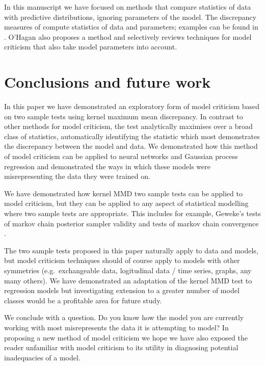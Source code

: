 \documentclass{article} %
\def\eg{e.g.\ }
\begin{document}
In this manuscript we have focused on methods that compare statistics of data with predictive distributions, ignoring parameters of the model.
The discrepancy measures of \cite{Gelman1996-ez} compute statistics of data and parameters; examples can be found in \cite{Gelman2013-st}.
O'Hagan \citep{OHagan2003-bc} also proposes a method and selectively reviews techniques for model criticism that also take model parameters into account.


\section{Conclusions and future work}

In this paper we have demonstrated an exploratory form of model criticism based on two sample tests using kernel maximum mean discrepancy.
In contrast to other methods for model criticism, the test analytically maximises over a broad class of statistics, automatically identifying the statistic which most demonstrates the discrepancy between the model and data.
We demonstrated how this method of model criticism can be applied to neural networks and Gaussian process regression and demonstrated the ways in which these models were misrepresenting the data they were trained on.

We have demonstrated how kernel MMD two sample tests can be applied to model criticism, but they can be applied to any aspect of statistical modelling where two sample tests are appropriate.
This includes for example, Geweke's tests of markov chain posterior sampler validity \citep{Geweke2004-yx} and tests of markov chain convergence \citep[e.g.][]{Cowles1996-qy}.

The two sample tests proposed in this paper naturally apply to \iid data and models, but model criticism techniques should of course apply to models with other symmetries (\eg exchangeable data, logitudinal data / time series, graphs, any many others).
We have demonstrated an adaptation of the kernel MMD test to regression models but investigating extension to a greater number of model classes would be a profitable area for future study.

We conclude with a question.
Do you know how the model you are currently working with most misrepresents the data it is attempting to model?
In proposing a new method of model criticism we hope we have also exposed the reader unfamiliar with model criticism to its utility in diagnosing potential inadequacies of a model.


\small



\end{document}
